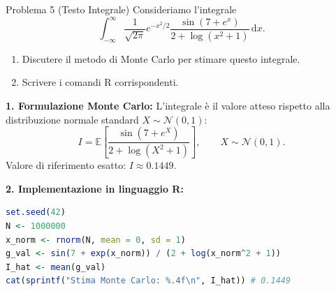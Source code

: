 \documentclass[11pt,a4paper]{article}
\newcommand{\EE}{\mathbb{E}}
\newcommand{\dx}{\mathrm{d}x}
\begin{document}
\begin{problemabox}{Problema 5 (Testo Integrale)}
Consideriamo l'integrale
\[
\int_{-\infty}^\infty \frac{1}{\sqrt{2\pi}} e^{-x^2/2} \frac{\sin(7 + e^x)}{2 + \log(x^2 + 1)} \, \dx.
\]
\begin{enumerate}[label=(\alph*)]
    \item Discutere il metodo di Monte Carlo per stimare questo integrale.
    \item Scrivere i comandi R corrispondenti.
\end{enumerate}
\end{problemabox}

\begin{soluzionebox}
\textbf{1. Formulazione Monte Carlo:}
L'integrale è il valore atteso rispetto alla distribuzione normale standard $X \sim \mathcal{N}(0, 1)$:
\[
I = \EE\left[ \frac{\sin(7 + e^X)}{2 + \log(X^2 + 1)} \right], \qquad X \sim \mathcal{N}(0, 1).
\]
Valore di riferimento esatto: $I \approx \mathbf{0.1449}$.

\textbf{2. Implementazione in linguaggio R:}
\begin{lstlisting}[language=R]
set.seed(42)
N <- 1000000
x_norm <- rnorm(N, mean = 0, sd = 1)
g_val <- sin(7 + exp(x_norm)) / (2 + log(x_norm^2 + 1))
I_hat <- mean(g_val)
cat(sprintf("Stima Monte Carlo: %.4f\n", I_hat)) # 0.1449
\end{lstlisting}
\end{soluzionebox}
\end{document}
